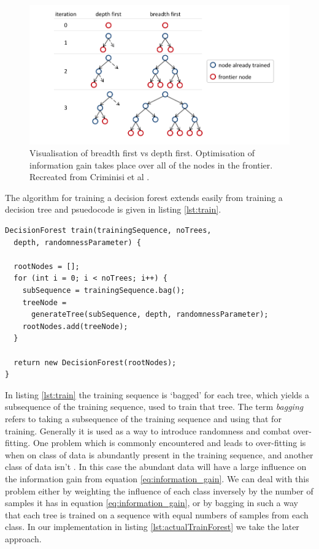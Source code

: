 \documentclass[12pt,twoside,notitlepage]{report}
\begin{document}
          \begin{figure}
              \centering
              \includegraphics[scale=0.3]{breadthfirst_vs_depthfirst}
              \caption{Visualisation of breadth first vs depth first. Optimisation of information gain takes place over 
              all of the nodes in the frontier. Recreated from Criminisi et al \cite{criminisi2013decision}.}
              \label{fig:breadth_first}
          \end{figure}

          The algorithm for training a decision forest extends easily from training a decision tree and psuedocode is 
          given in listing \ref{lst:train}.

          \begin{lstlisting}[float=tp,caption={Psuedocode to train a decision forest.},label={lst:train}]
DecisionForest train(trainingSequence, noTrees, 
  depth, randomnessParameter) {

  rootNodes = [];
  for (int i = 0; i < noTrees; i++) {
    subSequence = trainingSequence.bag();
    treeNode = 
      generateTree(subSequence, depth, randomnessParameter);
    rootNodes.add(treeNode);
  }

  return new DecisionForest(rootNodes);
}
          \end{lstlisting}

          In listing \ref{lst:train} the training sequence is `bagged' for each tree, which yields a subsequence of the 
          training sequence, used to train that tree. The term \textit{bagging} refers to taking a subsequence 
          of the training sequence and using that for training. Generally it is used as a way to introduce randomness and 
          combat over-fitting. One problem which is commonly encountered and leads to over-fitting is when 
          on class of data is abundantly present in the training sequence, and another class of data isn't \cite{criminisi2013decision}. 
          In this case the abundant data will have a large influence 
          on the information gain from equation \ref{eq:information_gain}. We 
          can deal with this problem either by weighting the influence of each class inversely by the number of samples it has in equation 
          \ref{eq:information_gain}, or by bagging in such a way that each tree is trained on a sequence with equal 
          numbers of samples from each class. In our implementation in listing \ref{lst:actualTrainForest} we take the 
          later approach. 
\end{document}
